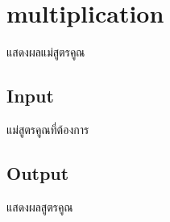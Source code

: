 \documentclass{article}
\begin{document}
\section*{multiplication}

แสดงผลแม่สูตรคูณ\\



\subsection*{Input}
{แม่สูตรคูณที่ต้องการ}\\



\subsection*{Output}
แสดงผลสูตรคูณ
\end{document}
